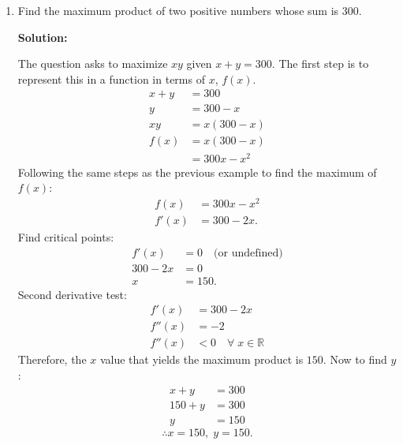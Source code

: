 \documentclass[12pt]{article}
\begin{document}
\begin{enumerate}
          \begin{center}
              * * * * *
          \end{center}

    \item Find the maximum product of two positive numbers whose sum is $300$.

          \noindent \textbf{Solution:}

          \noindent The question asks to maximize $xy$ given $x+y=300$. The first step is to represent this in a function in terms of $x$, $f(x)$.
          \begin{align*}
              x+y  & = 300        \\
              y    & = 300 - x    \\
              xy   & = x(300-x)   \\
              f(x) & = x(300-x)   \\
                   & = 300x - x^2
          \end{align*}
          Following the same steps as the previous example to find the maximum of $f(x)$:
          \begin{align*}
              f(x)  & = 300x - x^2 \\
              f'(x) & = 300 - 2x.
          \end{align*}
          Find critical points:
          \begin{align*}
              f'(x)    & = 0 \quad \text{(or undefined)} \\
              300 - 2x & = 0                             \\
              x        & = 150.
          \end{align*}
          Second derivative test:
          \begin{align*}
              f'(x)  & = 300 - 2x                            \\
              f''(x) & = -2                                  \\
              f''(x) & < 0 \quad \forall \; x \in \mathbb{R}
          \end{align*}
          Therefore, the $x$ value that yields the maximum product is $150$. Now to find $y$:
          \begin{align*}
              x + y   & = 300 \\
              150 + y & = 300 \\
              y       & = 150
          \end{align*}
          \[ \therefore x=150, \; y=150. \]


\end{enumerate}
\end{document}

